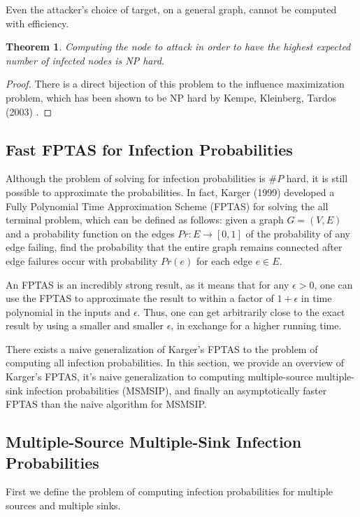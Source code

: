 \documentclass{article}
\theoremstyle{plain}
\newtheorem{theorem}{Theorem}
\begin{document}
Even the attacker's choice of target, on a general graph, cannot be computed with efficiency.

\begin{theorem}
  Computing the node to attack in order to have the highest expected number of infected nodes is NP hard.
\end{theorem}
\begin{proof}
  There is a direct bijection of this problem to the influence maximization problem, which has been shown to be NP hard by Kempe, Kleinberg, Tardos (2003) \cite{kempe-kleinberg-tardos03}.
\end{proof}


\subsection{Fast FPTAS for Infection Probabilities}

Although the problem of solving for infection probabilities is $\# P$ hard, it is still possible to approximate the probabilities. In fact, Karger (1999) developed a Fully Polynomial Time Approximation Scheme (FPTAS) for solving the all terminal problem, which can be defined as follows: given a graph $G = (V,E)$ and a probability function on the edges $Pr: E \to [0,1]$ of the probability of any edge failing, find the probability that the entire graph remains connected after edge failures occur with probability $Pr(e)$ for each edge $e \in E$.

An FPTAS is an incredibly strong result, as it means that for any $\epsilon > 0$, one can use the FPTAS to approximate the result to within a factor of $1 + \epsilon$ in time polynomial in the inputs and $\epsilon$. Thus, one can get arbitrarily close to the exact result by using a smaller and smaller $\epsilon$, in exchange for a higher running time.

There exists a naive generalization of Karger's FPTAS to the problem of computing all infection probabilities. In this section, we provide an overview of Karger's FPTAS, it's naive generalization to computing multiple-source multiple-sink infection probabilities (MSMSIP), and finally an asymptotically faster FPTAS than the naive algorithm for MSMSIP.

\subsection{Multiple-Source Multiple-Sink Infection Probabilities}

First we define the problem of computing infection probabilities for multiple sources and multiple sinks.
\end{document}
